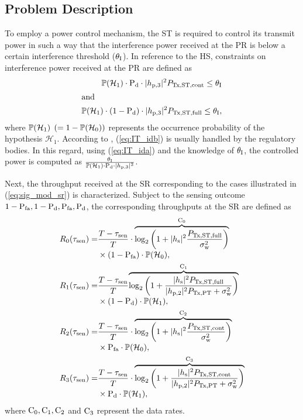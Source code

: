 \subsection{Problem Description}
To employ a power control mechanism, the ST is required to control its transmit power in such a way that the interference power received at the PR is below a certain interference threshold ($\theta_{\text{I}}$). In reference to the HS, constraints on interference power received at the PR are defined as
\begin{align}
\mathbb P(\mathcal{H}_1) \cdot \text{P}_{\text{d}} \cdot |h_{\text{p,3}}|^2 P_{\text{Tx,ST,cont}} \le \theta_{\text{I}} \label{eq:IT_ida} \\
\intertext{and   } 
\mathbb P(\mathcal{H}_1) \cdot (1 - \text{P}_{\text{d}}) \cdot |h_{\text{p,3}}|^2 P_{\text{Tx,ST,full}} \le \theta_{\text{I}} \label{eq:IT_idb},
\end{align}
where $\mathbb P(\mathcal{H}_1)$ $(= 1 - \mathbb P(\mathcal{H}_0))$ represents the occurrence probability of the hypothesis $\mathcal H_1$. 
According to \cite{Sharma14}, (\ref{eq:IT_idb}) is usually handled by the regulatory bodies. In this regard, using (\ref{eq:IT_ida}) and the knowledge of $\theta_{\text{I}}$, the controlled power is computed as $\frac{\theta_{\text{I}}}{\mathbb P(\mathcal{H}_1) \cdot \text{P}_{\text{d}} \cdot |h_{\text{p,3}}|^2}$.

Next, the throughput received at the SR corresponding to the cases illustrated in (\ref{eq:sig_mod_sr}) is characterized. Subject to the sensing outcome $1 - \text{P}_{\text{fa}}, 1 - \text{P}_{\text{d}}, \text{P}_{\text{fa}}, \text{P}_{\text{d}}$, the corresponding throughputs at the SR are defined as 
\begin{align}
R_{\text{0}}(\tau_{\text{sen}}) =& \frac{T- \tau_{\text{sen}}}{T} \cdot \smash[b]{\overbrace{\log_2 \left(1 + |h_{\text{s}}|^2 \frac{P_{\text{Tx,ST,full}}}{\sigma^2_{\text{w}}}\right)}^{\text{C}_{\text{0}}}} \nonumber \\ 
\quad & \times (1 - \text{P}_{\text{fa}} ) \cdot \mathbb P(\mathcal{H}_0),  \label{eq:Cap0} \\ 
R_{\text{1}}(\tau_{\text{sen}}) =& \frac{T- \tau_{\text{sen}}}{T} \smash[b]{\overbrace{\log_2 \left(1 + \frac{|h_{\text{s}}|^2 P_{\text{Tx,ST,full}} }{|h_{\text{p,2}}|^2 P_{\text{Tx,PT}}  + \sigma^2_{\text{w}}} \right)}^{\text{C}_{\text{1}}}} \nonumber \\ 
\quad & \times (1 - \text{P}_{\text{d}}) \cdot \mathbb P(\mathcal{H}_1),  \label{eq:Cap1} \\ 
R_{\text{2}}(\tau_{\text{sen}}) =& \frac{T- \tau_{\text{sen}}}{T} \cdot \smash[b]{\overbrace{\log_2 \left(1 + |h_{\text{s}}|^2 \frac{P_{\text{Tx,ST,cont}}}{\sigma^2_{\text{w}}}\right)}^{\text{C}_{\text{2}}}} \nonumber \\ 
\quad & \times \text{P}_{\text{fa}} \cdot \mathbb P(\mathcal{H}_0),  \label{eq:Cap2} \\ 
R_{\text{3}}(\tau_{\text{sen}}) =& \frac{T- \tau_{\text{sen}}}{T} \cdot \smash[b]{\overbrace{\log_2 \left(1 + \frac{|h_{\text{s}}|^2 P_{\text{Tx,ST,cont}} }{|h_{\text{p,2}}|^2 P_{\text{Tx,PT}}  + \sigma^2_{\text{w}}} \right)}^{\text{C}_{\text{3}}}}  \nonumber \\   
\quad & \times \text{P}_{\text{d}} \cdot \mathbb P(\mathcal{H}_1),  \label{eq:Cap3}  
\end{align}
where $\text{C}_{\text{0}}, \text{C}_{\text{1}}, \text{C}_{\text{2}}$ and $\text{C}_{\text{3}}$ represent the data rates.

